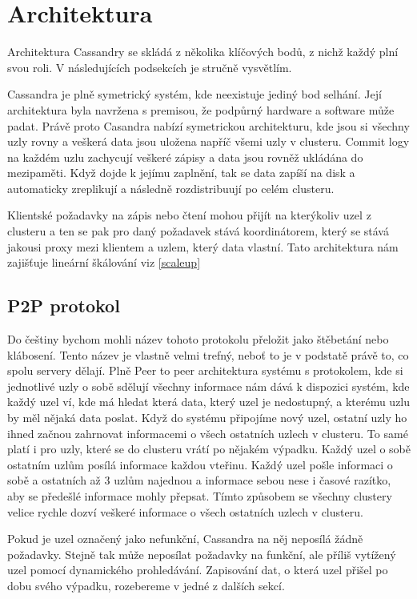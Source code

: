 \section{Architektura}
Architektura Cassandry se skládá z několika klíčových bodů, z nichž každý plní svou roli. V následujících podsekcích je stručně vysvětlím.

Cassandra je plně symetrický systém, kde neexistuje jediný bod selhání. Její architektura byla navržena s premisou, že podpůrný hardware a software může padat. Právě proto Casandra nabízí symetrickou architekturu, kde jsou si všechny uzly rovny a veškerá data jsou uložena napříč všemi uzly v clusteru. Commit logy na každém uzlu zachycují veškeré zápisy a data jsou rovněž ukládána do mezipaměti. Když dojde k jejímu zaplnění, tak se data zapíší na disk a automaticky zreplikují a následně rozdistribuují po celém clusteru. 

Klientské požadavky na zápis nebo čtení mohou přijít na kterýkoliv uzel z clusteru a ten se pak pro daný požadavek stává koordinátorem, který se stává jakousi proxy mezi klientem a uzlem, který data vlastní. Tato architektura nám zajišťuje lineární škálování viz \ref{scaleup}

\subsection{P2P protokol }
Do češtiny bychom mohli název tohoto protokolu přeložit jako štěbetání nebo klábosení. Tento název je vlastně velmi trefný, neboť to je v podstatě právě to, co spolu servery dělají. Plně Peer to peer architektura systému s protokolem, kde si jednotlivé uzly o sobě sdělují všechny informace nám dává k dispozici systém, kde každý uzel ví, kde má hledat která data, který uzel je nedostupný, a kterému uzlu by měl nějaká data poslat. Když do systému připojíme nový uzel, ostatní uzly ho ihned začnou zahrnovat informacemi o všech ostatních uzlech v clusteru. To samé platí i pro uzly, které se do clusteru vrátí po nějakém výpadku. Každý uzel o sobě ostatním uzlům posílá informace každou vteřinu. Každý uzel pošle informaci o sobě a ostatních až 3 uzlům najednou a informace sebou nese i časové razítko, aby se předešlé informace mohly přepsat. Tímto způsobem se všechny clustery velice rychle dozví veškeré informace o všech ostatních uzlech v clusteru. 

Pokud je uzel označený jako nefunkční, Cassandra na něj neposílá žádně požadavky. Stejně tak může neposílat požadavky na funkční, ale příliš vytížený uzel pomocí dynamického prohledávání. Zapisování dat, o která uzel přišel po dobu svého výpadku, rozebereme v jedné z dalších sekcí. 

